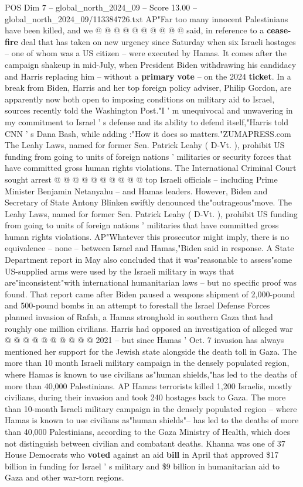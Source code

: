 \begin{textsample}{POS Dim 7 – global\_north\_2024\_09 – Score 13.00 – global\_north\_2024\_09/113384726.txt}
AP"Far too many innocent Palestinians have been killed, and we @ @ @ @ @ @ @ @ @ @ said, in reference to a \textbf{cease-fire} deal that has taken on new urgency since Saturday when six Israeli hostages -- one of whom was a US citizen -- were executed by Hamas.
It comes after the campaign shakeup in mid-July, when President Biden withdrawing his candidacy and Harris replacing him -- without a \textbf{primary} \textbf{vote} -- on the 2024 \textbf{ticket}.
In a break from Biden, Harris and her top foreign policy adviser, Philip Gordon, are apparently now both open to imposing conditions on military aid to Israel, sources recently told the Washington Post."I ' m unequivocal and unwavering in my commitment to Israel ' s defense and its ability to defend itself,"Harris told CNN ' s Dana Bash, while adding :"How it does so matters."ZUMAPRESS.com The Leahy Laws, named for former Sen.
Patrick Leahy ( D-Vt. ), prohibit US funding from going to units of foreign nations ' militaries or security forces that have committed gross human rights violations.
The International Criminal Court sought arrest @ @ @ @ @ @ @ @ @ @ top Israeli officials -- including Prime Minister Benjamin Netanyahu -- and Hamas leaders.
However, Biden and Secretary of State Antony Blinken swiftly denounced the"outrageous"move.
The Leahy Laws, named for former Sen.
Patrick Leahy ( D-Vt. ), prohibit US funding from going to units of foreign nations ' militaries that have committed gross human rights violations.
AP"Whatever this prosecutor might imply, there is no equivalence -- none -- between Israel and Hamas,"Biden said in response.
A State Department report in May also concluded that it was"reasonable to assess"some US-supplied arms were used by the Israeli military in ways that are"inconsistent"with international humanitarian laws -- but no specific proof was found.
That report came after Biden paused a weapons shipment of 2,000-pound and 500-pound bombs in an attempt to forestall the Israel Defense Forces planned invasion of Rafah, a Hamas stronghold in southern Gaza that had roughly one million civilians.
Harris had opposed an investigation of alleged war @ @ @ @ @ @ @ @ @ @ 2021 -- but since Hamas ' Oct. 7 invasion has always mentioned her support for the Jewish state alongside the death toll in Gaza.
The more than 10 month Israeli military campaign in the densely populated region, where Hamas is known to use civilians as"human shields,"has led to the deaths of more than 40,000 Palestinians.
AP Hamas terrorists killed 1,200 Israelis, mostly civilians, during their invasion and took 240 hostages back to Gaza.
The more than 10-month Israeli military campaign in the densely populated region -- where Hamas is known to use civilians as"human shields"-- has led to the deaths of more than 40,000 Palestinians, according to the Gaza Ministry of Health, which does not distinguish between civilian and combatant deaths.
Khanna was one of 37 House Democrats who \textbf{voted} against an aid \textbf{bill} in April that approved \$17 billion in funding for Israel ' s military and \$9 billion in humanitarian aid to Gaza and other war-torn regions.


\end{textsample}
